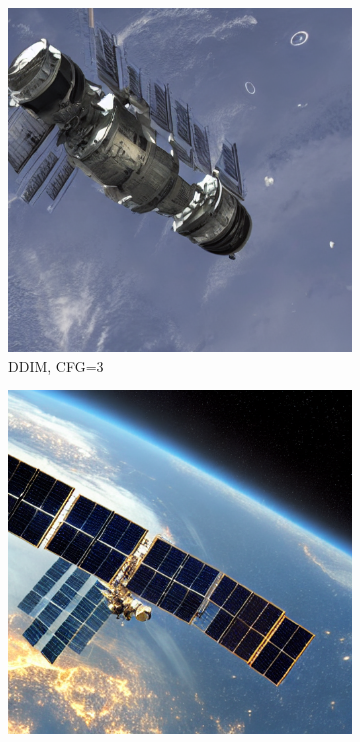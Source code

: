 \documentclass[10pt,twocolumn]{article}
\begin{document}
\begin{figure}[H]
    \centering
    \begin{subfigure}{0.32\textwidth}
        \includegraphics[width=\linewidth]{figures/baseline_ddim_cfg3.0_512_prompt10_20250712_113315.png}
        \caption{DDIM, CFG=3}
    \end{subfigure}
    \begin{subfigure}{0.32\textwidth}
        \includegraphics[width=\linewidth]{figures/baseline_ddim_cfg10.0_512_prompt10_20250712_113447.png}

\end{subfigure}
\end{figure}
\end{document}
